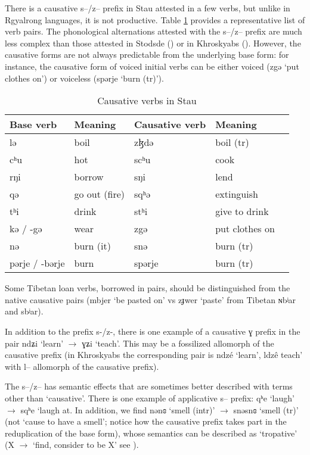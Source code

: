 \documentclass[oneside,a4paper,11pt]{article}
\newcommand{\ipa}[1]{{\phon #1}} %
\begin{document}
There is a causative \ipa{s--/z--} prefix in Stau attested in a few verbs, but unlike in Rgyalrong languages, it is not productive. Table \ref{tab:causative} provides a representative list of verb pairs. The phonological alternations attested with the \ipa{s--/z--} prefix are much less complex than those attested in Stodsde (\citealt{jackson07shangzhai}) or in Khroskyabs (\citealt{lai14caus}). However, the causative forms are not always predictable from the underlying base form: for instance, the causative form of voiced initial verbs can be either voiced (\ipa{zgə} `put clothes on') or voiceless (\ipa{spərje} `burn (tr)').
 
 
   \begin{table}[H]
 \caption{Causative verbs in Stau} \label{tab:causative} \centering 
\begin{tabular}{lllll}
\toprule
Base verb & Meaning & Causative verb & Meaning \\
\midrule
 \ipa{lə}  &boil& \ipa{zɮdə}& boil (tr)\\
  \ipa{cʰu}  & hot &  \ipa{scʰu}& cook \\
    \ipa{rŋi}  & borrow &  \ipa{sŋi}& lend \\
    \ipa{qə}  & go out (fire) &  \ipa{sqʰə}& extinguish\\
    \ipa{tʰi}  & drink &  \ipa{stʰi} & give to drink\\
    \ipa{kə} / \ipa{-gə} & wear &  \ipa{zgə} & put clothes on \\
     \ipa{nə}  & burn (it) &  \ipa{snə}& burn (tr)\\
     \ipa{pərje} / \ipa{-bərje} & burn &  \ipa{spərje} & burn (tr)\\
 \bottomrule
\end{tabular}
\end{table}

Some Tibetan loan verbs, borrowed in pairs, should be distinguished from the native causative pairs (\ipa{mbjer} `be pasted on' vs \ipa{zɟwer}  `paste' from Tibetan \ipa{ɴbʲar} and \ipa{sbʲar}).
 
 
 In addition to the prefix \ipa{s-/z-}, there is one example of a causative \ipa{ɣ} prefix in the pair   \ipa{ndʑi} `learn'    $\rightarrow$  \ipa{ɣʑi} `teach'. This may be a fossilized allomorph of the causative prefix (in Khroskyabs the corresponding pair is \ipa{ndzé} `learn', \ipa{ldzê}  teach' with \ipa{l--} allomorph of the causative prefix).
     
The \ipa{s--/z--} has semantic effects that are sometimes better described with terms other than `causative'. There is one example of applicative \ipa{s--} prefix: \ipa{qʰe}  `laugh' $\rightarrow$ \ipa{sqʰe} `laugh at. In addition, we find \ipa{nənɞ}  `smell (intr)' $\rightarrow$ \ipa{snəsnɞ} `smell (tr)' (not `cause to have a smell'; notice how the causative prefix takes part in the reduplication of the base form), whose semantics can be described as `tropative' (X $\rightarrow$ `find, consider to be X' see \citealt{jacques13tropative}).
 
\end{document}
